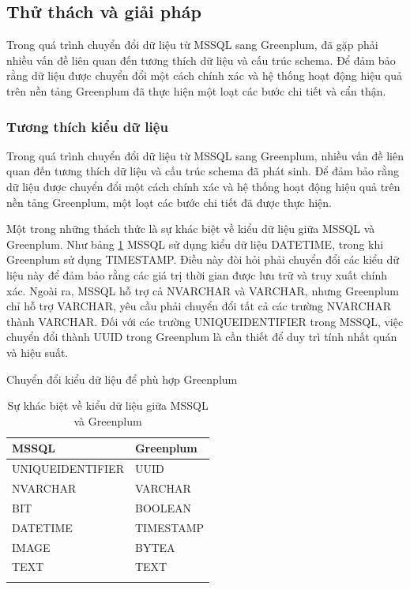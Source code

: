 \documentclass{article}[14pt]
\begin{document}
\subsection{Thử thách và giải pháp}

Trong quá trình chuyển đổi dữ liệu từ MSSQL sang Greenplum, đã gặp phải nhiều vấn đề liên quan đến tương thích dữ liệu và cấu trúc schema. Để đảm bảo rằng dữ liệu được chuyển đổi một cách chính xác và hệ thống hoạt động hiệu quả trên nền tảng Greenplum đã thực hiện một loạt các bước chi tiết và cẩn thận.



\subsubsection{Tương thích kiểu dữ liệu}

Trong quá trình chuyển đổi dữ liệu từ MSSQL sang Greenplum, nhiều vấn đề liên quan đến tương thích dữ liệu và cấu trúc schema đã phát sinh. Để đảm bảo rằng dữ liệu được chuyển đổi một cách chính xác và hệ thống hoạt động hiệu quả trên nền tảng Greenplum, một loạt các bước chi tiết đã được thực hiện.

Một trong những thách thức là sự khác biệt về kiểu dữ liệu giữa MSSQL và Greenplum. Như bảng \ref{tab:tbtype} MSSQL sử dụng kiểu dữ liệu DATETIME, trong khi Greenplum sử dụng TIMESTAMP. Điều này đòi hỏi phải chuyển đổi các kiểu dữ liệu này để đảm bảo rằng các giá trị thời gian được lưu trữ và truy xuất chính xác. Ngoài ra, MSSQL hỗ trợ cả NVARCHAR và VARCHAR, nhưng Greenplum chỉ hỗ trợ VARCHAR, yêu cầu phải chuyển đổi tất cả các trường NVARCHAR thành VARCHAR. Đối với các trường UNIQUEIDENTIFIER trong MSSQL, việc chuyển đổi thành UUID trong Greenplum là cần thiết để duy trì tính nhất quán và hiệu suất.


Chuyển đổi kiểu dữ liệu để phù hợp Greenplum

\begin{longtable}{|p{}|p{}|}
\hline
\textbf{MSSQL} & \textbf{Greenplum} \\ \hline  %
UNIQUEIDENTIFIER & UUID \\ \hline
NVARCHAR & VARCHAR \\ \hline
BIT & BOOLEAN \\ \hline
DATETIME & TIMESTAMP \\ \hline
IMAGE & BYTEA \\ \hline
TEXT & TEXT \\ \hline
\caption{Sự khác biệt về kiểu dữ liệu giữa MSSQL và Greenplum}
\label{tab:tbtype}
\end{longtable}
\end{document}
